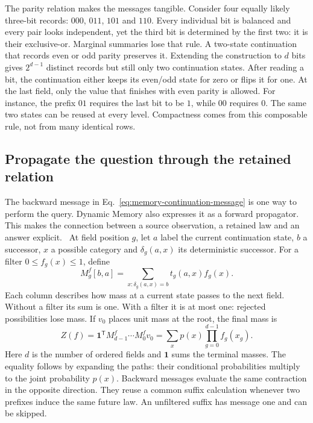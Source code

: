 The parity relation makes the messages tangible. Consider four equally likely three-bit records: $000$, $011$, $101$ and $110$. Every individual bit is balanced and every pair looks independent, yet the third bit is determined by the first two: it is their exclusive-or. Marginal summaries lose that rule. A two-state continuation that records even or odd parity preserves it. Extending the construction to $d$ bits gives $2^{d-1}$ distinct records but still only two continuation states. After reading a bit, the continuation either keeps its even/odd state for zero or flips it for one. At the last field, only the value that finishes with even parity is allowed. For instance, the prefix $01$ requires the last bit to be $1$, while $00$ requires $0$. The same two states can be reused at every level. Compactness comes from this composable rule, not from many identical rows.


\subsection{Propagate the question through the retained relation}
\label{subsec:dynamic-propagator}

The backward message in Eq.~\eqref{eq:memory-continuation-message} is one way to perform the query. Dynamic Memory also expresses it as a forward propagator. This makes the connection between a source observation, a retained law and an answer explicit.~\cite{Referencea10bf0,McCaul2026164581} At field position $g$, let $a$ label the current continuation state, $b$ a successor, $x$ a possible category and $\delta_g(a,x)$ its deterministic successor. For a filter $0\leq f_g(x)\leq1$, define
\begin{equation}
 M_g^f[b,a]=\sum_{x:\delta_g(a,x)=b}t_g(a,x)f_g(x).
 \label{eq:dynamic-query-matrix}
\end{equation}
Each column describes how mass at a current state passes to the next field. Without a filter its sum is one. With a filter it is at most one: rejected possibilities lose mass. If $v_0$ places unit mass at the root, the final mass is
\begin{equation}
 Z(f)=\mathbf1^{\mathsf T}M_{d-1}^f\cdots M_0^f v_0
     =\sum_xp(x)\prod_{g=0}^{d-1}f_g(x_g).
 \label{eq:dynamic-query-mass}
\end{equation}
Here $d$ is the number of ordered fields and $\mathbf1$ sums the terminal masses. The equality follows by expanding the paths: their conditional probabilities multiply to the joint probability $p(x)$. Backward messages evaluate the same contraction in the opposite direction. They reuse a common suffix calculation whenever two prefixes induce the same future law. An unfiltered suffix has message one and can be skipped.

